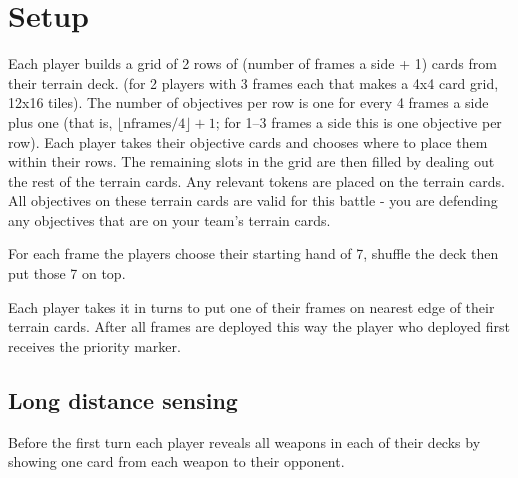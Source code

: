 \documentclass[a4paper, twocolumn]{article}
\begin{document}
\begin{figure}[!ht]
  \centering
  \resizebox{\textwidth}{!}{}
\end{figure}

\onecolumn
\section{Setup}
Each player builds a grid of 2 rows of (number of frames a side + 1) cards from their terrain deck.
(for 2 players with 3 frames each that makes a 4x4 card grid, 12x16 tiles).
The number of objectives per row is one for every 4 frames a side plus one (that is, $\lfloor \mathrm{nframes} / 4 \rfloor + 1$; for 1--3 frames a side this is one objective per row).
Each player takes their objective cards and chooses where to place them within their rows.
The remaining slots in the grid are then filled by dealing out the rest of the terrain cards.
Any relevant tokens are placed on the terrain cards.
All objectives on these terrain cards are valid for this battle - you are defending any objectives that are on your team's terrain cards.

For each frame the players choose their starting hand of 7, shuffle the deck then put those 7 on top.

Each player takes it in turns to put one of their frames on nearest edge of their terrain cards.
After all frames are deployed this way the player who deployed first receives the priority marker.

\subsection{Long distance sensing}
Before the first turn each player reveals all weapons in each of their decks by showing one card from each weapon to their opponent.
\end{document}
